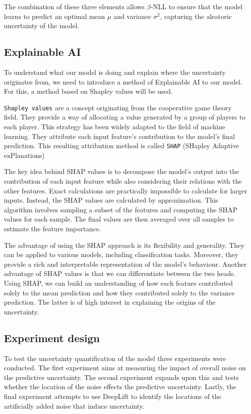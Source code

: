 The combination of these three elements allows $\beta$-NLL to ensure that the model learns to predict an optimal mean $\mu$ and variance $\sigma^2$, capturing the aleatoric uncertainty of the model.


\subsection{Explainable AI}

To understand what our model is doing and explain where the uncertainty originates from, we need to introduce a method of Explainable AI to our model. For this, a method based on Shapley values will be used.

\verb|Shapley values| are a concept originating from the cooperative game theory field. They provide a way of allocating a value generated by a group of players to each player. This strategy has been widely adapted to the field of machine learning. They attribute each input feature's contribution to the model's final prediction. This resulting attribution method is called \verb|SHAP| (SHapley Adaptive exPlanations)

The key idea behind SHAP values is to decompose the model's output into the contribution of each input feature while also considering their relations with the other features. Exact calculations are practically impossible to calculate for larger inputs. Instead, the SHAP values are calculated by approximation. This algorithm involves sampling a subset of the features and computing the SHAP values for each sample. The final values are then averaged over all samples to estimate the feature importance.

The advantage of using the SHAP approach is its flexibility and generality. They can be applied to various models, including classification tasks. Moreover, they provide a rich and interpretable representation of the model's behaviour. Another advantage of SHAP values is that we can differentiate between the two heads. Using SHAP, we can build an understanding of how each feature contributed solely to the mean prediction and how they contributed solely to the variance prediction. The latter is of high interest in explaining the origins of the uncertainty. 

\subsection{Experiment design}

To test the uncertainty quantification of the model three experiments were conducted. The first experiment aims at measuring the impact of overall noise on the predictive uncertainty. The second experiment expands upon this and tests whether the location of the noise effects the predictive uncertainty. Lastly, the final experiment attempts to use DeepLift to identify the locations of the artificially added noise that induce uncertainty.

